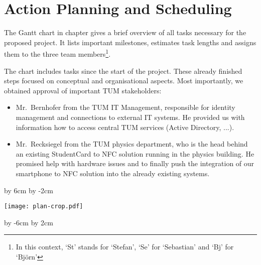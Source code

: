 \section{Action Planning and Scheduling}\label{sec:plan}






The Gantt chart in chapter gives a brief overview of all tasks necessary for the proposed project.
It lists important milestones, estimates task lengths and assigns them to the three team members\footnote{In this context, `St' stands for `Stefan', `Se' for `Sebastian' and `Bj' for `Björn'}.

The chart includes tasks since the start of the project.
These already finished steps focused on conceptual and organisational aspects.
Most importantly, we obtained approval of important TUM stakeholders:
\begin{itemize}
\item Mr.~Bernhofer from the TUM IT Management, responsible for identity management and connections to external IT systems. He provided us with information how to access central TUM services (Active Directory, ...).
\item Mr.~Recksiegel from the TUM physics department, who is the head behind an existing StudentCard to NFC solution running in the physics building. He promised help with hardware issues and to finally push the integration of our smartphone to NFC solution into the already existing systems.
\end{itemize}











\par\vfill\break %

\advance\vsize by 6cm %
\advance\voffset by -2cm %
\centerline{\texttt{[image: plan-crop.pdf]}}
\par\vfill\break %

\advance\vsize by -6cm %
\advance\voffset by 2cm %